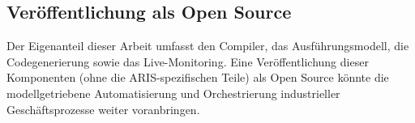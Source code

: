 \subsection{Veröffentlichung als Open Source}

Der Eigenanteil dieser Arbeit umfasst den Compiler, das Ausführungsmodell, die 
Codegenerierung sowie das Live-Monitoring. Eine Veröffentlichung dieser Komponenten 
(ohne die ARIS-spezifischen Teile) als Open Source könnte die modellgetriebene 
Automatisierung und Orchestrierung industrieller Geschäftsprozesse weiter voranbringen.
